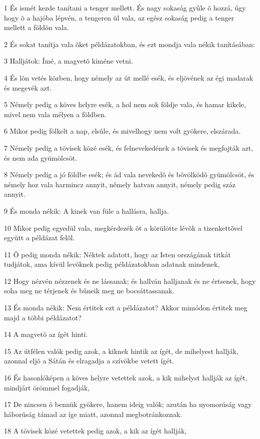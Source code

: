\par 1 És ismét kezde tanítani a tenger mellett. És nagy sokaság gyûle õ hozzá, úgy hogy õ a hajóba lépvén, a tengeren ül vala, az egész sokaság pedig a tenger mellett a földön vala.
\par 2 És sokat tanítja vala õket példázatokban, és ezt mondja vala nékik tanításában:
\par 3 Halljátok: Ímé, a magvetõ kiméne vetni.
\par 4 És lõn vetés közben, hogy némely az út mellé esék, és eljövének az égi madarak és megevék azt.
\par 5 Némely pedig a köves helyre esék, a hol nem sok földje vala, és hamar kikele, mivel nem vala mélyen a földben.
\par 6 Mikor pedig fölkelt a nap, elsûle, és mivelhogy nem volt gyökere, elszárada.
\par 7 Némely pedig a tövisek közé esék, és felnevekedének a tövisek és megfojták azt, és nem ada gyümölcsöt.
\par 8 Némely pedig a jó földbe esék; és ád vala nevekedõ és bõvölködõ gyümölcsöt, és némely hoz vala harmincz annyit, némely hatvan annyit, némely pedig száz annyit.
\par 9 És monda nékik: A kinek van füle a hallásra, hallja.
\par 10 Mikor pedig egyedül vala, megkérdezék õt a körülötte lévõk a tizenkettõvel együtt a példázat felõl.
\par 11 Õ pedig monda nékik: Néktek adatott, hogy az Isten országának titkát tudjátok, ama kívül levõknek pedig példázatokban adatnak mindenek,
\par 12 Hogy nézvén nézzenek és ne lássanak; és hallván halljanak és ne értsenek, hogy soha meg ne térjenek és bûneik meg ne bocsáttassanak.
\par 13 És monda nékik: Nem értitek ezt a példázatot? Akkor mimódon értitek meg majd a többi példázatot?
\par 14 A magvetõ az ígét hinti.
\par 15 Az útfélen valók pedig azok, a kiknek hintik az ígét, de mihelyest hallják, azonnal eljõ a Sátán és elragadja a szívökbe vetett ígét.
\par 16 És hasonlóképen a köves helyre vetettek azok, a kik mihelyst hallják az ígét, mindjárt örömmel fogadják,
\par 17 De nincsen õ bennük gyökere, hanem ideig valók; azután ha nyomorúság vagy háborúság támad az íge miatt, azonnal megbotránkoznak.
\par 18 A tövisek közé vetettek pedig azok, a kik az ígét hallják,
